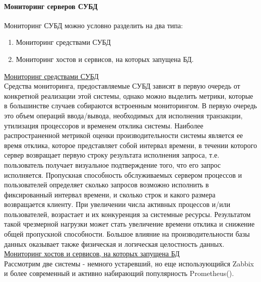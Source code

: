 \paragraph{Мониторинг серверов СУБД}
Мониторинг СУБД можно условно разделить на два типа:
\begin{enumerate}
    \item Мониторинг средствами СУБД
    \item Мониторинг хостов и сервисов, на которых запущена БД.
\end{enumerate}
\underline{Мониторинг средствами СУБД} \\ Средства мониторинга, предоставляемые СУБД зависят в первую очередь от конкретной реализации этой системы, однако можно выделить метрики, которые в большинстве случаев собираются встроенным мониторингом. В первую очередь это объем операций ввода/вывода, необходимых для исполнения транзакции, утилизация процессоров и временем отклика системы. Наиболее распространенной метрикой оценки производительности системы является ее время отклика, которое представляет собой интервал времени, в течении которого сервер возвращает первую строку результата исполнения запроса, т.е. пользователь получает визуальное подтверждение того, что его запрос исполняется. Пропускная способность обслуживаемых сервером процессов и пользователей определяет сколько запросов возможно исполнить в фиксированный интервал времени, и сколько строк и какого размера возвращается клиенту. При увеличении числа активных процессов и/или пользователей, возрастает и их конкуренция за системные ресурсы. Результатом такой чрезмерной нагрузки может стать увеличение времени отклика и снижение общей пропускной способности. Большое влияние на производительности базы данных оказывает также физическая и логическая целостность данных. \\
\underline{Мониторинг хостов и сервисов, на которых запущена БД} \\ Рассмотрим две системы - немного устаревший, но еще использующийся Zabbix и более современный и активно набирающий популярность Prometheus(\autocite{Prometheus-vs-Zabbix}).
